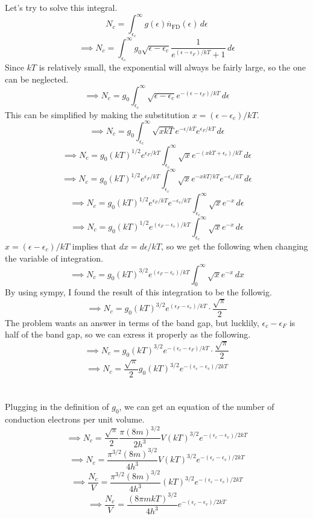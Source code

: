 \documentclass[12pt]{article}
\begin{document}
\begin{flushleft}
Let's try to solve this integral.
$$N_c=\int_{\epsilon_c}^{\infty}g(\epsilon)\overline{n}_\text{FD}(\epsilon)\,d\epsilon$$
$$\implies N_c=\int_{\epsilon_c}^{\infty}g_0\sqrt{\epsilon-\epsilon_c}\frac{1}{e^{(\epsilon-\epsilon_F)/kT}+1}\,d\epsilon$$
Since $kT$ is relatively small, the exponential will always be fairly large, so the one can be neglected.
$$\implies N_c=g_0\int_{\epsilon_c}^{\infty}\sqrt{\epsilon-\epsilon_c}e^{-(\epsilon-\epsilon_F)/kT}\,d\epsilon$$
This can be simplified by making the substitution $x=(\epsilon-\epsilon_c)/kT$.
$$\implies N_c=g_0\int_{\epsilon_c}^{\infty}\sqrt{xkT}e^{-\epsilon/kT}e^{\epsilon_F/kT}\,d\epsilon$$
$$\implies N_c=g_0(kT)^{1/2}e^{\epsilon_F/kT}\int_{\epsilon_c}^{\infty}\sqrt{x}e^{-(xkT+\epsilon_c)/kT}\,d\epsilon$$
$$\implies N_c=g_0(kT)^{1/2}e^{\epsilon_F/kT}\int_{\epsilon_c}^{\infty}\sqrt{x}e^{-xkT/kT}e^{-\epsilon_c/kT}\,d\epsilon$$
$$\implies N_c=g_0(kT)^{1/2}e^{\epsilon_F/kT}e^{-\epsilon_c/kT}\int_{\epsilon_c}^{\infty}\sqrt{x}e^{-x}\,d\epsilon$$
$$\implies N_c=g_0(kT)^{1/2}e^{(\epsilon_F-\epsilon_c)/kT}\int_{\epsilon_c}^{\infty}\sqrt{x}e^{-x}\,d\epsilon$$
$x=(\epsilon-\epsilon_c)/kT$ implies that $dx=d\epsilon/kT$, so we get the following when changing the variable of integration.
$$\implies N_c=g_0(kT)^{3/2}e^{(\epsilon_F-\epsilon_c)/kT}\int_0^{\infty}\sqrt{x}e^{-x}\,dx$$
By using sympy, I found the result of this integration to be the followig.
$$\implies N_c=g_0(kT)^{3/2}e^{(\epsilon_F-\epsilon_c)/kT}\cdot\frac{\sqrt{\pi}}{2}$$
The problem wants an answer in terms of the band gap, but lucklily, $\epsilon_c-\epsilon_F$ is half of the band gap, so we can exress it properly as the following.
$$\implies N_c=g_0(kT)^{3/2}e^{-(\epsilon_c-\epsilon_F)/kT}\cdot\frac{\sqrt{\pi}}{2}$$
$$\implies N_c=\frac{\sqrt{\pi}}{2}g_0(kT)^{3/2}e^{-(\epsilon_c-\epsilon_v)/2kT}$$\\~\\

Plugging in the definition of $g_0$, we can get an equation of the number of conduction electrons per unit volume.
$$\implies N_c=\frac{\sqrt{\pi}}{2}\frac{\pi(8m)^{3/2}}{2h^3}V(kT)^{3/2}e^{-(\epsilon_c-\epsilon_v)/2kT}$$
$$\implies N_c=\frac{\pi^{3/2}(8m)^{3/2}}{4h^3}V(kT)^{3/2}e^{-(\epsilon_c-\epsilon_v)/2kT}$$
$$\implies \frac{N_c}{V}=\frac{\pi^{3/2}(8m)^{3/2}}{4h^3}(kT)^{3/2}e^{-(\epsilon_c-\epsilon_v)/2kT}$$
$$\implies \frac{N_c}{V}=\frac{(8\pi mkT)^{3/2}}{4h^3}e^{-(\epsilon_c-\epsilon_v)/2kT}$$\\~\\~\\




\end{flushleft}
\end{document}
